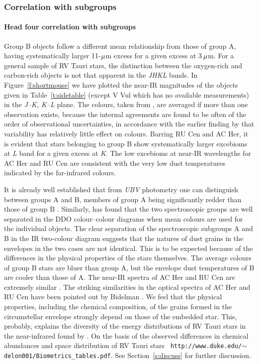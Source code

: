 \documentclass[useAMS,usenatbib]{biom}
\begin{document}
\subsubsection{Correlation with subgroups}%
\paragraph{Head four correlation with subgroups}%
Group B objects follow a different mean relationship from those of
group A, having systematically larger 11-$\mu$m excess for a given
excess at 3$\,\mu$m. For a general sample of RV Tauri stars, the
distinction between the oxygen-rich and carbon-rich objects is not
that apparent in the {\it JHKL\/} bands. In Figure~\ref{f:shortmouse}
we have plotted the near-IR magnitudes of the objects given in
Table~\ref{t:sidetable} (except V Vul which has no available
measurements) in the {\it J--K, K--L\/} plane. The colours, taken from
\citet{b9}, are averaged if more than one observation exists, because
the internal agreements are found to be often of the order of
observational uncertainties, in accordance with the earlier finding by
\citet{b5} that variability has relatively little effect on
colours. Barring RU Cen and AC Her, it is evident that stars belonging
to group B show systematically larger excebioms at {\it L\/} band for
a given excess at {\it K}. The low excebioms at near-IR wavelengths
for AC Her and RU Cen are consistent with the very low dust
temperatures indicated by the far-infrared colours.
%

It is already well established that from {\it UBV\/} photometry one
can distinguish between groups A and B, members of group A being
significantly redder than those of group B \citep{b20}.  Similarly,
\citet{b4} has found that the two spectroscopic groups are well
separated in the DDO colour--colour diagrams when mean colours are
used for the individual objects. The clear separation of the
spectroscopic subgroups A and B in the IR two-colour diagram suggests
that the natures of dust grains in the envelopes in the two cases are
not identical. This is to be expected because of the differences in
the physical properties of the stars themselves. The average colours
of group B stars are bluer than group A, but the envelope dust
temperatures of B are cooler than those of A. The near-IR spectra of
AC Her and RU Cen are extremely similar \citep{b6}. The striking
similarities in the optical spectra of AC Her and RU Cen have been
pointed out by Bidelman \citep{b18}. We feel that the physical
properties, including the chemical composition, of the grains formed
in the circumstellar envelope strongly depend on those of the embedded
star. This, probably, explains the diversity of the energy
distributions of RV Tauri stars in the near-infrared found by
\citet{b6}. On the basis of the observed differences in chemical
abundances and space distribution of RV Tauri stars {\tt
http://www.duke.edu/$\sim$delon001/Biometrics\_tables.pdf}.  See
Section~\ref{s:discuss} for further discussion.
\end{document}
